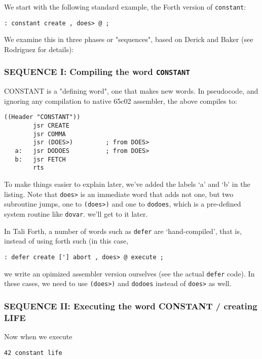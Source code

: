 We start with the following standard example, the Forth version of
\texttt{constant}: 

\begin{lstlisting}[frame=single]
        : constant create , does> @ ; 
\end{lstlisting}

We examine this in three phases or "sequences", based on Derick and Baker (see
Rodriguez for details):   


\subsubsection{SEQUENCE I: Compiling the word \texttt{CONSTANT}}

CONSTANT is a "defining word", one that makes new words. In pseudocode, and
ignoring any compilation to native 65c02 assembler, the above compiles to: 
\begin{lstlisting}[frame=single]
        ((Header "CONSTANT")) 
        jsr CREATE
        jsr COMMA
        jsr (DOES>)         ; from DOES>
   a:   jsr DODOES          ; from DOES>
   b:   jsr FETCH
        rts
\end{lstlisting}

To make things easier to explain later, we've added the labels `a' and `b' in
the listing. Note that \texttt{does>} is an immediate word that adds not one, but two
subroutine jumps, one to \texttt{(does>)} and one to \texttt{dodoes}, which is a pre-defined
system routine like \texttt{dovar}. we'll get to it later.

In Tali Forth, a number of words such as \texttt{defer} are
`hand-compiled', that is, instead of using forth such (in this case, 

\begin{lstlisting}[frame=single]
        : defer create ['] abort , does> @ execute ; 
\end{lstlisting}

we write an opimized assembler version ourselves (see the actual \texttt{defer}
code). In these cases, we need to use \texttt{(does>)} and \texttt{dodoes}
instead of \texttt{does>} as well.


\subsubsection{SEQUENCE II: Executing the word CONSTANT / creating LIFE }

Now when we execute

\begin{lstlisting}[frame=single]
        42 constant life
\end{lstlisting}

